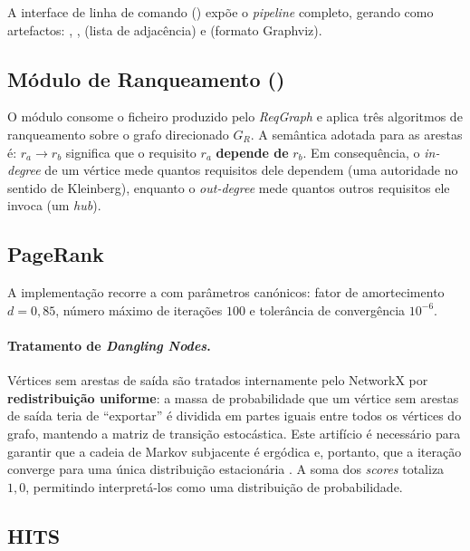 A interface de linha de comando
() expõe
o \emph{pipeline} completo, gerando como artefactos:
, ,
 (lista de adjacência) e
 (formato Graphviz).

\subsection{Módulo de Ranqueamento ()}
\label{sec:ranker}

O módulo  consome o ficheiro 
produzido pelo \emph{ReqGraph} e aplica três algoritmos de
ranqueamento sobre o grafo direcionado $G_R$. A semântica adotada
para as arestas é: $r_a \rightarrow r_b$ significa que o requisito
$r_a$ \textbf{depende de} $r_b$. Em consequência, o \emph{in-degree}
de um vértice mede quantos requisitos dele dependem (uma autoridade
no sentido de Kleinberg), enquanto o \emph{out-degree} mede quantos
outros requisitos ele invoca (um \emph{hub}).

\subsection{PageRank}
\label{sec:impl-pagerank}

A implementação recorre a  com parâmetros
canónicos: fator de amortecimento $d = 0{,}85$, número máximo de
iterações $100$ e tolerância de convergência $10^{-6}$.

\paragraph{Tratamento de \emph{Dangling Nodes}.}
\label{sec:dangling}
Vértices sem arestas de saída são tratados internamente pelo
NetworkX por \textbf{redistribuição uniforme}: a massa de
probabilidade que um vértice sem arestas de saída teria de
``exportar'' é dividida em partes iguais entre todos os vértices do
grafo, mantendo a matriz de transição estocástica. Este artifício é
necessário para garantir que a cadeia de Markov subjacente é
ergódica e, portanto, que a iteração converge para uma única
distribuição estacionária \parencite{brin1998}. A soma dos
\emph{scores} totaliza $1{,}0$, permitindo interpretá-los como uma
distribuição de probabilidade.

\subsection{HITS}
\label{sec:impl-hits}


